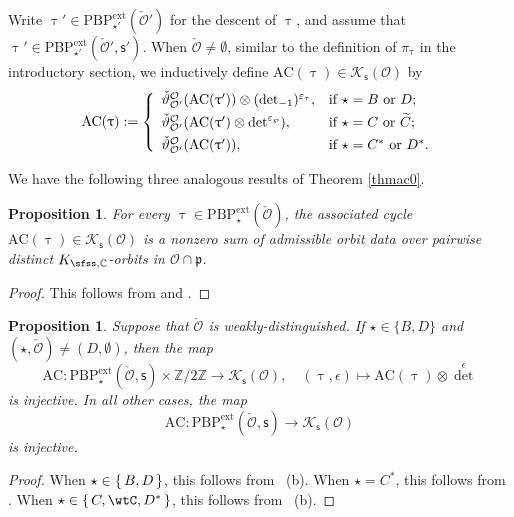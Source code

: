 \documentclass[12pt,a4paper]{amsart}
\def\abs#1{\left|{#1}\right|}
\newcommand{\CK}{{\mathcal {K}}}
\newcommand{\CO}{{\mathcal {O}}}
\newcommand{\p}{\mathfrak p}
\newcommand{\Z}{\mathbb{Z}}
\numberwithin{equation}{section}
\newtheorem{prop}[thm]{Proposition}
\theoremstyle{remark}
\def\PBPe{\mathrm{PBP}^{\mathrm{ext}}}
\begin{document}
 Write  $\uptau'\in \PBPe_{\star'}(\check \CO')$ for the descent of $\uptau$, and assume that $\uptau'\in \PBPe_{\star'}(\check \CO',\mathsf s')$.
When $\check \CO\neq\emptyset$,  similar to the definition of $\pi_\uptau$ in the introductory section, we inductively define
$\mathrm{AC}(\uptau)\in \CK_{\mathsf s}(\CO) $ by
 \[
   \mathrm{AC}(\uptau):=\left\{
     \begin{array}{ll}
         \check \vartheta_{\CO'}^{\CO}(\mathrm{AC}(\uptau'))\otimes ({\det}_{-1})^{\varepsilon_{\tau}}, &\hbox{if  $\star=B$ or $D$}; \smallskip\\
         \check \vartheta_{\CO'}^{\CO}(\mathrm{AC}(\uptau')\otimes \det^{\varepsilon_{\wp}}), &\hbox{if $\star=C$ or $\widetilde C$};\smallskip \\
              \check \vartheta_{\CO'}^{\CO}(\mathrm{AC}(\uptau')), &\hbox{if $\star=C^*$ or $D^*$}. \\
            \end{array}
   \right.
 \]
 
We have the following three analogous results of Theorem \ref{thmac0}.

\begin{prop}\label{thmac1}
 For every $\uptau\in \PBPe_\star(\check \CO)$,  the associated cycle $\mathrm{AC}(\uptau)\in \CK_{\mathsf s}(\CO)$ is a nonzero  sum of  admissible orbit data 
over pairwise distinct $K_{\sfss,\C}$-orbits in $\CO\cap \p$.
\end{prop}

\begin{proof}
  This follows from  and .
\end{proof}

\begin{prop}\label{thmac2}
Suppose that  $\check \CO$ is weakly-distinguished.  If $\star\in \{B,D\}$ and $(\star, \check \CO)\neq (D, \emptyset)$, then  the map
\[
\mathrm{AC}: \PBPe_\star(\check \CO,\mathsf s)\times \Z/2\Z \rightarrow  \CK_{\mathsf s}(\CO),\quad (\uptau, \epsilon)\mapsto \mathrm{AC}(\uptau)\otimes {\det}^{\epsilon}
\]
is injective. In all other cases, the
map
\[
\mathrm{AC}: \PBPe_\star(\check \CO,\mathsf s)\rightarrow  \CK_{\mathsf s}(\CO)
\]
is injective.
\end{prop}
\begin{proof}
When $\star\in \set{B,D}$, this follows from ~(b).
When $\star = C^{*}$, this follows from .
When $\star\in \set{C,\wtC,D^{*}}$, this follows from ~(b).
\end{proof}
\end{document}
